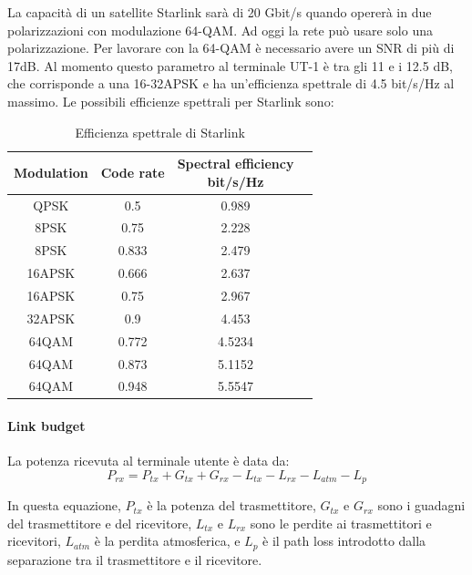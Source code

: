 La capacità di un satellite Starlink sarà di 20 Gbit/s quando opererà in due polarizzazioni con modulazione 64-\ac{QAM}.
Ad oggi la rete può usare solo una polarizzazione.
Per lavorare con la 64-\ac{QAM} è necessario avere un \ac{SNR} di più di 17dB.
Al momento questo parametro al terminale UT-1 è tra gli 11 e i 12.5 dB, che corrisponde a una 16-32\ac{APSK} e ha un'efficienza spettrale di 4.5 bit/s/Hz al massimo.
Le possibili efficienze spettrali per Starlink sono:

\begin{table}[h]
\centering
\begin{tabular}{|c|c|c|c|}
\hline
\textbf{Modulation} & \textbf{Code rate} & \makecell{\textbf{Spectral efficiency}\\ \textbf{bit/s/Hz}} \\ \hline
QPSK     & 0.5   & 0.989  \\ \hline
8PSK     & 0.75  & 2.228  \\ \hline
8PSK     & 0.833 & 2.479  \\ \hline
16APSK   & 0.666 & 2.637  \\ \hline
16APSK   & 0.75  & 2.967  \\ \hline
32APSK   & 0.9   & 4.453  \\ \hline
64QAM    & 0.772 & 4.5234 \\ \hline
64QAM    & 0.873 & 5.1152 \\ \hline
64QAM    & 0.948 & 5.5547 \\ \hline
\end{tabular}
\caption{Efficienza spettrale di Starlink \cite{rozenvasser_estimation_2023}}
\end{table}

\paragraph{Link budget}
La potenza ricevuta al terminale utente è data da:
\begin{equation}
P_{rx} = P_{tx} + G_{tx} + G_{rx} - L_{tx} - L_{rx} - L_{atm} - L_{p}
\label{eq:received-power}
\end{equation}

In questa equazione, $P_{tx}$ è la potenza del trasmettitore, $G_{tx}$ e $G_{rx}$ sono i guadagni del trasmettitore e del ricevitore, $L_{tx}$ e $L_{rx}$ sono le perdite ai trasmettitori e ricevitori, $L_{atm}$ è la perdita atmosferica, e $L_{p}$ è il path loss introdotto dalla separazione tra il trasmettitore e il ricevitore.

